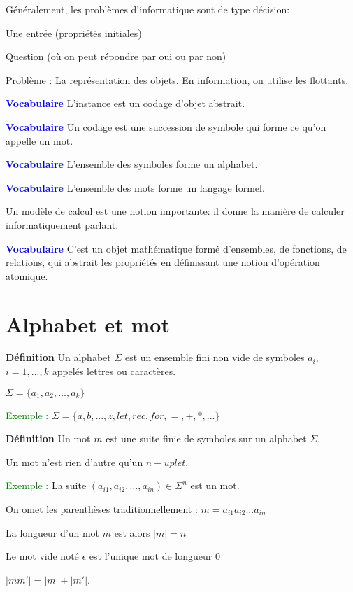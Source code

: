 \documentclass[a4paper, 11pt, hidelinks]{article}
\newcommand{\ex}{\textcolor{green}{Exemple :} }
\newcommand{\de}{\large \textbf{Définition} \large }
\newcommand{\bs}{\bigskip}
\newcommand{\voca}{\textcolor{blue}{\textbf{Vocabulaire} } }
\begin{document}
Généralement, les problèmes d'informatique sont de type décision:

Une entrée (propriétés initiales)

Question (où on peut répondre par oui ou par non)

\bs 

Problème : La représentation des objets. En information, on utilise les flottants.
\bs

\voca L'instance est un codage d'objet abstrait.

\bs
\voca Un codage est une succession de symbole qui forme ce qu'on appelle un mot.

\bs
\voca L'ensemble des symboles forme un alphabet.

\bs
\voca L'ensemble des mots forme un langage formel.

\bs
Un modèle de calcul est une notion importante: il donne la manière de calculer informatiquement parlant.
\bs

\voca C'est un objet mathématique formé d'ensembles, de fonctions, de relations, qui abstrait
les propriétés en définissant une notion d'opération atomique.


\section{Alphabet et mot}


\de Un alphabet $\Sigma$ est un ensemble fini non vide de symboles $a_i$,
$i=1,...,k$ appelés lettres ou caractères.

$\Sigma= \{a_1,a_2,...,a_k\}$

\bs

\ex $\Sigma=\{a,b,...,z,let,rec,for,=,+,*,...\}$

\bs

\de Un mot $m$ est une suite finie de symboles sur un alphabet $\Sigma$.

Un mot n'est rien d'autre qu'un $n-uplet$.

\bs

\ex La suite $(a_{i1},a_{i2},...,a_{in}) \in \Sigma^n$ est un mot.

On omet les parenthèses traditionnellement : $m=a_{i1} a_{i2}... a_{in}$

\bs 

La longueur d'un mot $m$ est alors $|m|= n$

Le mot vide noté $\epsilon$ est l'unique mot de longueur $0$

$|mm'|=|m|+|m'|$.
\end{document}
